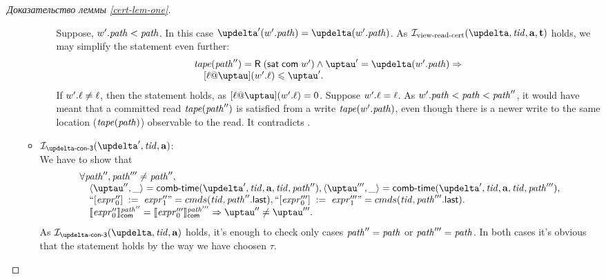 \begin{proof}[Доказательство леммы \ref{cert-lem-one}]
\begin{itemize}
\begin{itemize}
\begin{itemize}
              Suppose, $w'.\mathit{path} < \mathit{path}$. In this case $\delta'(\w'.\cpath) = \delta(\w'.\cpath)$.
              As $\invViewReadCERT(\delta, \tId, \aT, \tT)$ holds, we may simplify the statement even further:
          \[\begin{array}{l}
            \tape(\cpath'') = \tapeRead{(\tapeSatisfied{\Committed}{\w'})} \land
               \tau' = \delta(\w'.\cpath) \Rightarrow \\
            \quad [\loc @ \tau](\w'.\loc) \le \tau'. \\
          \end{array}\]
              If $w'.\ell \not = \ell$, then the statement holds, as $[\loc @ \tau](\w'.\loc) = 0$.
              Suppose $w'.\ell = \ell$. As $w'.\mathit{path} < \mathit{path} < \mathit{path}''$, it would have meant that
              a committed read $\mathit{tape}(\mathit{path}'')$ is satisfied from a write $\mathit{tape}(w'.\mathit{path})$, even though
              there is a newer write to the same location ($\mathit{tape}(\mathit{path})$) observable to the read. It contradicts
              \app{\ref{inv:invAWriteWriteRead}}.
          \end{itemize}

          
        \item $\invDeltaDefThree(\delta', \tId, \aT)$: \\
          We have to show that
          \[\begin{array}{l}
            \forall \cpath'', \cpath''' \not = \cpath'', \\
            \quad \angled{\tau'', \_} = \deltaHmap(\delta', \tId, \aT, \tId, \cpath''),
                  \angled{\tau''', \_} = \deltaHmap(\delta', \tId, \aT, \tId, \cpath'''), \\
            \quad ``\writeInst{\expr''_0}{\expr''_1}"   = \Cprom(\tId, \lastInstr{\cpath''}),
                  ``\writeInst{\expr'''_0}{\expr'''_1}" = \Cprom(\tId, \lastInstr{\cpath'''}). \\
            \quad \semfcom{\expr''_0}{\cpath''} = \semfcom{\expr'''_0}{\cpath'''} \Rightarrow \tau'' \not = \tau'''.
          \end{array}\]
          As $\invDeltaDefThree(\delta, \tId, \aT)$ holds, it's enough to check only cases $\mathit{path}'' = \mathit{path}$ or $\mathit{path}''' = \mathit{path}$.
          In both cases it's obvious that the statement holds by the way we have choosen $\tau$.


\end{itemize}
\end{itemize}
\end{proof}
